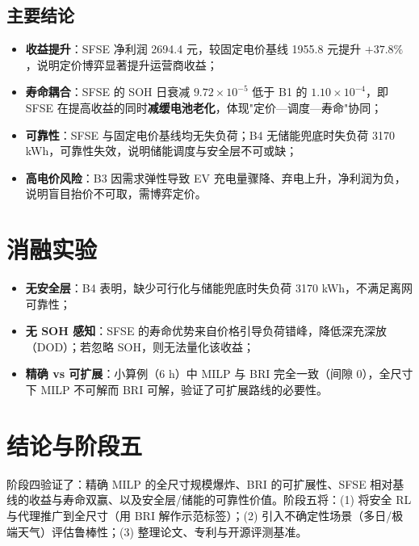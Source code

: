 \documentclass[UTF8,a4paper,11pt]{ctexart}
\begin{document}
\subsection{主要结论}
\begin{itemize}
  \item \textbf{收益提升}：SFSE 净利润 2694.4 元，较固定电价基线 1955.8 元提升 $\mathbf{+37.8\%}$，说明定价博弈显著提升运营商收益；
  \item \textbf{寿命耦合}：SFSE 的 SOH 日衰减 $9.72\times10^{-5}$ 低于 B1 的 $1.10\times10^{-4}$，即 SFSE 在提高收益的同时\textbf{减缓电池老化}，体现"定价—调度—寿命"协同；
  \item \textbf{可靠性}：SFSE 与固定电价基线均无失负荷；B4 无储能兜底时失负荷 3170 kWh，可靠性失效，说明储能调度与安全层不可或缺；
  \item \textbf{高电价风险}：B3 因需求弹性导致 EV 充电量骤降、弃电上升，净利润为负，说明盲目抬价不可取，需博弈定价。
\end{itemize}

\section{消融实验}
\begin{itemize}
  \item \textbf{无安全层}：B4 表明，缺少可行化与储能兜底时失负荷 3170 kWh，不满足离网可靠性；
  \item \textbf{无 SOH 感知}：SFSE 的寿命优势来自价格引导负荷错峰，降低深充深放（DOD）；若忽略 SOH，则无法量化该收益；
  \item \textbf{精确 vs 可扩展}：小算例（6 h）中 MILP 与 BRI 完全一致（间隙 0），全尺寸下 MILP 不可解而 BRI 可解，验证了可扩展路线的必要性。
\end{itemize}

\section{结论与阶段五}
阶段四验证了：精确 MILP 的全尺寸规模爆炸、BRI 的可扩展性、SFSE 相对基线的收益与寿命双赢、以及安全层/储能的可靠性价值。阶段五将：(1) 将安全 RL 与代理推广到全尺寸（用 BRI 解作示范标签）；(2) 引入不确定性场景（多日/极端天气）评估鲁棒性；(3) 整理论文、专利与开源评测基准。
\end{document}
